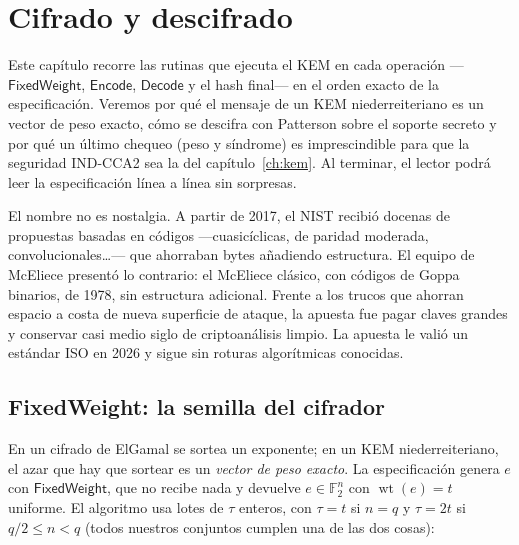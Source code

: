 \documentclass[11pt,a4paper,oneside]{report}
\newcommand{\F}{\mathbb{F}}
\newcommand{\wt}{\operatorname{wt}}
\newcommand{\Ftwo}{\F_2}
\begin{document}
\chapter{Cifrado y descifrado}\label{ch:encapdecap}

\begin{roadmap}
Este capítulo recorre las rutinas que ejecuta el KEM en cada
operación ---$\textsf{FixedWeight}$, $\textsf{Encode}$, $\textsf{Decode}$
y el hash final--- en el orden exacto de la especificación. Veremos por
qué el mensaje de un KEM niederreiteriano es un vector de peso exacto,
cómo se descifra con Patterson sobre el soporte secreto y por qué un
último chequeo (peso y síndrome) es imprescindible para que la
seguridad IND-CCA2 sea la del capítulo~\ref{ch:kem}. Al terminar, el
lector podrá leer la especificación línea a línea sin sorpresas.
\end{roadmap}

\begin{historia}
El nombre no es nostalgia. A partir de 2017, el NIST recibió docenas
de propuestas basadas en códigos ---cuasicíclicas, de paridad moderada,
convolucionales\ldots--- que ahorraban bytes añadiendo estructura. El
equipo de McEliece presentó lo contrario: el McEliece clásico, con
códigos de Goppa binarios, de 1978, sin estructura adicional. Frente a
los trucos que ahorran espacio a costa de nueva superficie de ataque,
la apuesta fue pagar claves grandes y conservar casi medio siglo de
criptoanálisis limpio. La apuesta le valió un estándar ISO en 2026 y
sigue sin roturas algorítmicas conocidas.
\end{historia}

\section{\textsf{FixedWeight}: la semilla del cifrador}

En un cifrado de ElGamal se sortea un exponente; en un KEM
niederreiteriano, el azar que hay que sortear es un \emph{vector de
peso exacto}. La especificación genera $e$ con $\textsf{FixedWeight}$,
que no recibe nada y devuelve $e\in\Ftwo^{n}$ con $\wt(e)=t$ uniforme. El
algoritmo usa lotes de $\tau$ enteros, con $\tau=t$ si $n=q$ y
$\tau=2t$ si $q/2\le n<q$ (todos nuestros conjuntos cumplen una de las
dos cosas):
\end{document}
